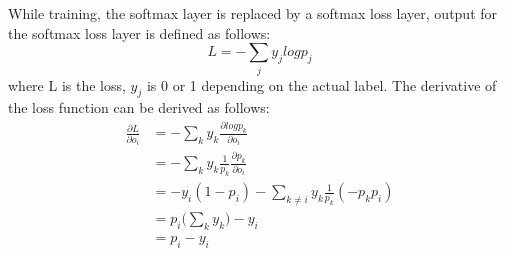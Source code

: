 While training, the softmax layer is replaced by a softmax loss layer, output 
for the softmax loss layer is defined as follows:
\[L = - \sum_j y_j log p_j\]
where L is the loss, $y_j$ is 0 or 1 depending on the actual 
label.\label{section:lossfunc} The 
derivative of the loss function can be derived as follows:
\begin{align*}
 \frac{\partial L}{\partial o_i} &= -\sum_k y_k\frac{\partial log p_k}{\partial 
o_i} \\
&= -\sum_k y_k \frac{1}{p_k}\frac{\partial p_k}{\partial o_i}\\
&= -y_i(1-p_i) - \sum_{k\neq i} y_k \frac{1}{p_k}(-p_kp_i)\\
&= p_i\bigg(\sum_k y_k\bigg) - y_i\\
&= p_i-y_i
\end{align*}

